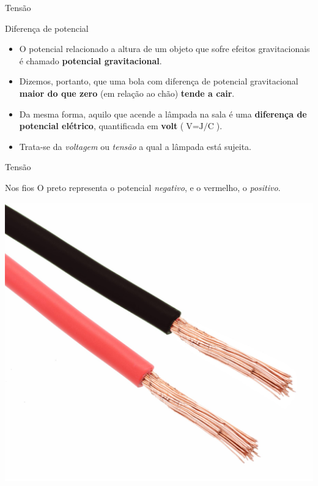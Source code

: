 \begin{frame}{Tensão}
	\begin{block}{Diferença de potencial}
		\begin{itemize}
			\item O potencial relacionado a altura de um objeto que sofre efeitos gravitacionais é chamado \textbf{potencial gravitacional}.
			\item Dizemos, portanto, que uma bola com diferença de potencial gravitacional \textbf{maior do que zero} (em relação ao chão) \textbf{tende a cair}.
			\item Da mesma forma, aquilo que acende a lâmpada na sala é uma \textbf{diferença de potencial elétrico}, quantificada em \textbf{volt} ($ \si{\volt}=\si{\joule\per\coulomb} $).
			\item Trata-se da \textit{voltagem} ou \textit{tensão} a qual a lâmpada está sujeita.
		\end{itemize}
	\end{block}
\end{frame}


\begin{frame}{Tensão}
	\begin{block}{Nos fios}
		O preto representa o potencial \textit{negativo}, e o vermelho, o \textit{positivo}.
	\end{block}

	\centering
	\includegraphics[width=0.6\linewidth]{Figuras/Ch01/fig6}

\end{frame}


